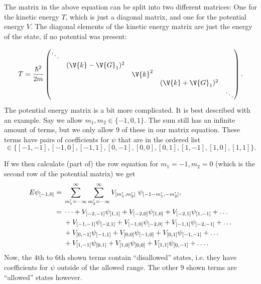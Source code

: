 \documentclass[main.tex]{subfiles}
\begin{document}
	The matrix in the above equation can be split into two different matrices: One for the kinetic energy $ T $, which is just a diagonal matrix, and one for the potential energy $ V $. The diagonal elements of the kinetic energy matrix are just the energy of the state, if no potential was present:
	
	\begin{equation}
		T = \frac{\hbar^2}{2m} \begin{pmatrix}
			\ddots	& 		 			&			& 					& \\
					& (\V{k}-\V{G}_1)^2	& 			& 					& \\
					& 	 				& \V{k}^2	& 					& \\
					&					&			& (\V{k}+\V{G}_1)^2	& \\
					&					&			&					& \ddots
		\end{pmatrix}.
	\end{equation}
	The potential energy matrix is a bit more complicated. It is best described with an example. Say we allow $ m_1, m_2 \in \{-1,0,1\} $. The sum still has an infinite amount of terms, but we only allow 9 of these in our matrix equation. These terms have pairs of coefficients for $ \psi $ that are in the ordered list
	\begin{equation}
		[m_1, m_2] \in \{ [-1, -1], [-1, 0], [-1, 1], [0, -1], [0, 0], [0, 1], [1,-1], [1, 0], [1,1]  \}.
	\end{equation}
	
	If we then calculate (part of) the row equation for $ m_1 = -1, m_2 = 0 $ (which is the second row of the potential matrix) we get
	\begin{align*}
		E \psi\coef{-1,0} = {} & \sum_{m'_1 =  -\infty}^{\infty}\sum_{m'_2 = -\infty}^{\infty} V\coef{m'_1, m'_2} \ \psi\coef{-1-m'_1, -m'_2}, \\
		= {} & \dots +  V\coef{-2, -1}\psi\coef{1,1} + V\coef{-2, 0} \psi\coef{1, 0} + V\coef{-2, 1}\psi\coef{1,-1} +  \dots  \\
		& + V\coef{-1, -1} \psi\coef{-2, 1} + V\coef{-1, 0} \psi\coef{-2, 0} + V\coef{-1, 1} \psi\coef{-2, -1} + \dots\\
		& + V\coef{0, -1} \psi\coef{-1, 1} + V\coef{0, 0} \psi\coef{-1, 0} + V\coef{0, 1}\psi\coef{-1, -1} + \dots\\
		&+ V\coef{1, -1} \psi \coef{0,1} + V\coef{1, 0} \psi \coef{0, 0} + V\coef{1,1} \psi \coef{0, -1} + \dots.
	\end{align*}
	Now, the 4th to 6th  shown terms contain ``disallowed'' states, i.e. they have coefficients for $ \psi $ outside of the allowed range. The other 9 shown terms are ``allowed'' states however.
	
\end{document}
